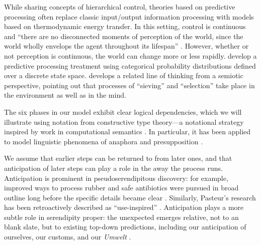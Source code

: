 While sharing concepts of hierarchical control, theories based on
predictive processing often replace classic input/output information
processing with models based on thermodynamic energy transfer.  In
this setting, control is continuous and ``there are no disconnected
moments of perception of the world, since the world wholly envelops
the agent throughout its lifespan''
\cite[pp.~9--10]{10.3389/frobt.2018.00021}.  However, whether or not
perception is continuous, the world can change more or less rapidly.
\citet{KWISTHOUT201784} develop a predictive processing treatment
using categorical probability distributions defined over a discrete
state space.  \citet{kockelman2011biosemiosis} develops a related line
of thinking from a semiotic perspective, pointing out that processes
of ``sieving'' and ``selection'' take place in the environment as well
as in the mind.


The six phases in our model exhibit clear logical dependencies, which
we will illustrate using notation from constructive type theory---a
notational strategy inspired by work in computational semantics
\cite{Chatzikyriakidis2018}.  In particular, it has been applied to
model linguistic phenomena of anaphora and presupposition
\cite{10.1007/978-3-662-43742-1_2,krahmer1999presupposition,piwek2000presuppositions}.

We assume that earlier steps can be returned to from later ones, and
that anticipation of later steps can play a role in the away the
process runs.  Anticipation is prominent in pseudoserendipitous
discovery: for example, improved ways to process rubber and safe
antibiotics were pursued in broad outline long before the specific
details became clear \cite{fleming,goodyear1855gum}.  Similarly,
Pasteur's research has been retroactively described as
``use-inspired'' \cite{stokes1997pasteur}.  Anticipation plays a more
subtle role in serendipity proper: the unexpected emerges relative,
not to an blank slate, but to existing top-down predictions, including
our anticipation of ourselves, our customs, and our \emph{Umwelt}
\cite{dennett_2013}.



